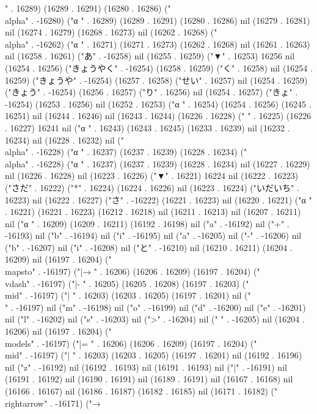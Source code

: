 " . 16289) (16289 . 16291) (16280 . 16286) ("\\alpha" . -16280) ("α
" . 16289) (16289 . 16291) (16280 . 16286) nil (16279 . 16281) nil (16274 . 16279) (16268 . 16273) nil (16262 . 16268) ("\\alpha" . -16262) ("α
" . 16271) (16271 . 16273) (16262 . 16268) nil (16261 . 16263) nil (16258 . 16261) ("あ" . -16258) nil (16255 . 16259) ("▼" . 16253) 16256 nil (16254 . 16256) ("きょうやく" . -16254) (16258 . 16259) ("く" . 16258) nil (16254 . 16259) ("きょうや" . -16254) (16257 . 16258) ("せい" . 16257) nil (16254 . 16259) ("きょう" . -16254) (16256 . 16257) ("り" . 16256) nil (16254 . 16257) ("きょ" . -16254) (16253 . 16256) nil (16252 . 16253) ("α
" . 16254) (16254 . 16256) (16245 . 16251) nil (16244 . 16246) nil (16243 . 16244) (16226 . 16228) (" " . 16225) (16226 . 16227) 16241 nil ("α
" . 16243) (16243 . 16245) (16233 . 16239) nil (16232 . 16234) nil (16228 . 16232) nil ("\\alpha" . -16228) ("α
" . 16237) (16237 . 16239) (16228 . 16234) ("\\alpha" . -16228) ("α
" . 16237) (16237 . 16239) (16228 . 16234) nil (16227 . 16229) nil (16226 . 16228) nil (16223 . 16226) ("▼" . 16221) 16224 nil (16222 . 16223) ("さだ" . 16222) ("*" . 16224) (16224 . 16226) nil (16223 . 16224) ("いだいち" . 16223) nil (16222 . 16227) ("さ" . -16222) (16221 . 16223) nil (16220 . 16221) ("α
" . 16221) (16221 . 16223) (16212 . 16218) nil (16211 . 16213) nil (16207 . 16211) nil ("α
" . 16209) (16209 . 16211) (16192 . 16198) nil ("a" . -16192) nil ("+" . -16193) nil ("b" . -16194) nil ("i" . -16195) nil ("a" . -16205) nil ("-" . -16206) nil ("b" . -16207) nil ("i" . -16208) nil ("と" . -16210) nil (16210 . 16211) (16204 . 16209) nil (16197 . 16204) ("\\mapsto" . -16197) ("|→
" . 16206) (16206 . 16209) (16197 . 16204) ("\\vdash" . -16197) ("|-
" . 16205) (16205 . 16208) (16197 . 16203) ("\\mid" . -16197) ("|
" . 16203) (16203 . 16205) (16197 . 16201) nil ("\\" . -16197) nil ("m" . -16198) nil ("o" . -16199) nil ("d" . -16200) nil ("e" . -16201) nil ("l" . -16202) nil ("s" . -16203) nil (">" . -16204) nil (" " . -16205) nil (16204 . 16206) nil (16197 . 16204) ("\\models" . -16197) ("|=
" . 16206) (16206 . 16209) (16197 . 16204) ("\\mid" . -16197) ("|
" . 16203) (16203 . 16205) (16197 . 16201) nil (16192 . 16196) nil ("z" . -16192) nil (16192 . 16193) nil (16191 . 16193) nil ("|" . -16191) nil (16191 . 16192) nil (16190 . 16191) nil (16189 . 16191) nil (16167 . 16168) nil (16166 . 16167) nil (16186 . 16187) (16182 . 16185) nil (16171 . 16182) ("\\rightarrow" . -16171) ("→
